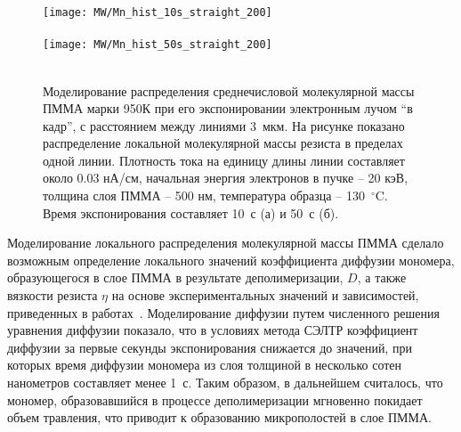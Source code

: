 \begin{figure}[t]
	\begin{center}
		\texttt{[image: MW/Mn\_hist\_10s\_straight\_200]} \\
		\vspace{-3.7em}  \vspace{2.7em} \\
		\texttt{[image: MW/Mn\_hist\_50s\_straight\_200]} \\
		\vspace{-3.7em}  \vspace{3.7em} \\
	\end{center}
	\vspace{-2.5em}
	\caption{Моделирование распределения среднечисловой молекулярной массы ПММА марки 950К при его экспонировании электронным лучом ``в кадр'', с расстоянием между линиями 3~мкм. На рисунке показано распределение локальной молекулярной массы резиста в пределах одной линии. Плотность тока на единицу длины линии составляет около 0.03 нА/см, начальная энергия электронов в пучке – 20 кэВ, толщина слоя ПММА -- 500 нм, температура образца -- 130~$^\circ$C. Время экспонирования составляет 10~с (а) и 50~с (б).}
	\label{fig:Mn_hist}
\end{figure}

Моделирование локального распределения молекулярной массы ПММА сделало возможным определение локального значений коэффициента диффузии мономера, образующегося в слое ПММА в результате деполимеризации, $D$, а также вязкости резиста $\eta$ на основе экспериментальных значений и зависимостей, приведенных в работах~\cite{Fragala_3_diffusion, Berens_diffusion_Mn, Leveder_2010}. Моделирование диффузии путем численного решения уравнения диффузии показало, что в условиях метода СЭЛТР коэффициент диффузии за первые секунды экспонирования снижается до значений, при которых время диффузии мономера из слоя толщиной в несколько сотен нанометров составляет менее 1~с. Таким образом, в дальнейшем считалось, что мономер, образовавшийся в процессе деполимеризации мгновенно покидает объем травления, что приводит к образованию микрополостей в слое ПММА.

